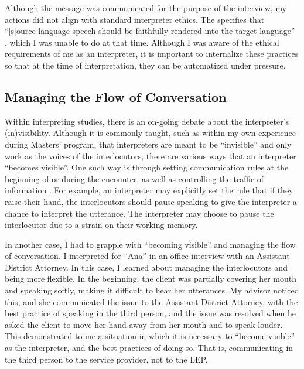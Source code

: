 \documentclass{article}
\begin{document}
Although the message was communicated for the purpose of the interview, my actions did not align with standard interpreter ethics. The \citet{najit_code_of_ethics} specifies that “[s]ource-language speech should be faithfully rendered into the target language” , which I was unable to do at that time. Although I was aware of the ethical requirements of me as an interpreter, it is important to internalize these practices so that at the time of interpretation, they can be automatized under pressure.

\subsection{Managing the Flow of Conversation}

Within interpreting studies, there is an on-going debate about the interpreter’s (in)visibility. Although it is commonly taught, such as within my own experience during Masters’ program, that interpreters are meant to be “invisible” and only work as the voices of the interlocutors, there are various ways that an interpreter “becomes visible”. One such way is through setting communication rules at the beginning of or during the encounter, as well as controlling the traffic of information \citep{roy2000interpreting}. For example, an interpreter may explicitly set the rule that if they raise their hand, the interlocutors should pause speaking to give the interpreter a chance to interpret the utterance. The interpreter may choose to pause the interlocutor due to a strain on their working memory.

In another case, I had to grapple with “becoming visible” and managing the flow of conversation. I interpreted for “Ana” in an office interview with an Assistant District Attorney. In this case, I learned about managing the interlocutors and being more flexible. In the beginning, the client was partially covering her mouth and speaking softly, making it difficult to hear her utterances. My advisor noticed this, and she communicated the issue to the Assistant District Attorney, with the best practice of speaking in the third person, and the issue was resolved when he asked the client to move her hand away from her mouth and to speak louder. This demonstrated to me a situation in which it is necessary to “become visible” as the interpreter, and the best practices of doing so. That is, communicating in the third person to the service provider, not to the LEP.
\end{document}
